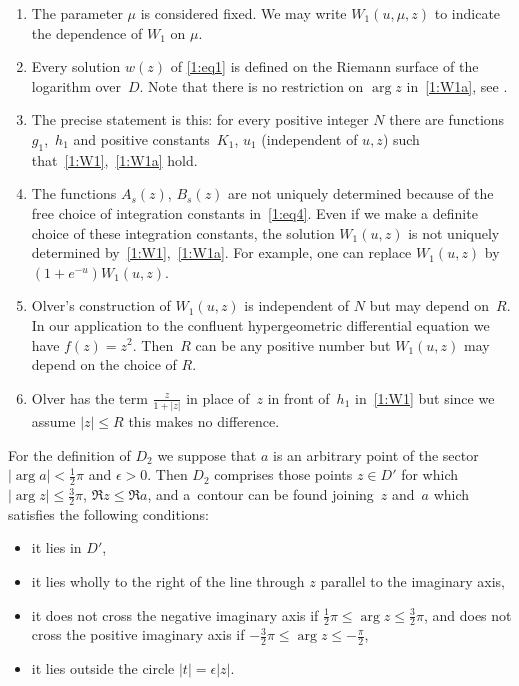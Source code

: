 \begin{Remarks}\quad
\begin{enumerate}\itemsep=0pt
\item
The parameter $\mu$ is considered f\/ixed. We may write $W_1(u,\mu,z)$ to indicate the dependence of $W_1$ on $\mu$.
\item
Every solution $w(z)$ of \eqref{1:eq1} is def\/ined on the Riemann surface of the logarithm over~$D$. Note that there is no restriction on $\arg z$ in~\eqref{1:W1a}, see \cite[p.~76]{O}.
\item
The precise statement is this: for every positive integer $N$ there are functions~$g_1$,~$h_1$ and positive constants~$K_1$, $u_1$ (independent of $u,z$)
such that~\eqref{1:W1},~\eqref{1:W1a} hold.
\item
The functions $A_s(z)$, $B_s(z)$ are not uniquely determined because of the free choice of
integration constants in~\eqref{1:eq4}. Even if we make a def\/inite choice of these integration constants, the solution $W_1(u,z)$
is not uniquely determined by~\eqref{1:W1},~\eqref{1:W1a}. For example, one can replace $W_1(u,z)$ by $(1+e^{-u})W_1(u,z)$.
\item
Olver's construction of $W_1(u,z)$ is independent of $N$ but may depend on~$R$.
In our application to the conf\/luent hypergeometric dif\/ferential equation we have $f(z)=z^2$. Then~$R$ can be any positive number
but $W_1(u,z)$ may depend on the choice of $R$.
\item
Olver has the term $\frac{z}{1+|z|}$ in place of~$z$ in front of~$h_1$ in~\eqref{1:W1} but since we assume $|z|\le R$ this makes no dif\/ference.
\end{enumerate}
\end{Remarks}

For the def\/inition of $D_2$ we suppose that $a$ is an arbitrary point of the sector $|\arg a|<\frac12\pi$ and $\epsilon>0$.
Then $D_2$ comprises those points $z\in D'$ for which $|\arg z|\le\frac32\pi$, $\Re z\le \Re a$, and a~contour can be found joining~$z$ and~$a$
which satisf\/ies the following conditions:
\begin{itemize}\itemsep=0pt
\item[(i)] it lies in $D'$,
\item[(ii)]
it lies wholly to the right of the line through $z$ parallel to the imaginary axis,
\item[(iii)]
it does not cross the negative imaginary axis if $\frac12\pi\le \arg z\le \frac32\pi$, and does not cross
the positive imaginary axis if $-\frac32\pi\le \arg z\le -\frac\pi2$,
\item[(iv)]
it lies outside the circle $|t|=\epsilon |z|$.
\end{itemize}

